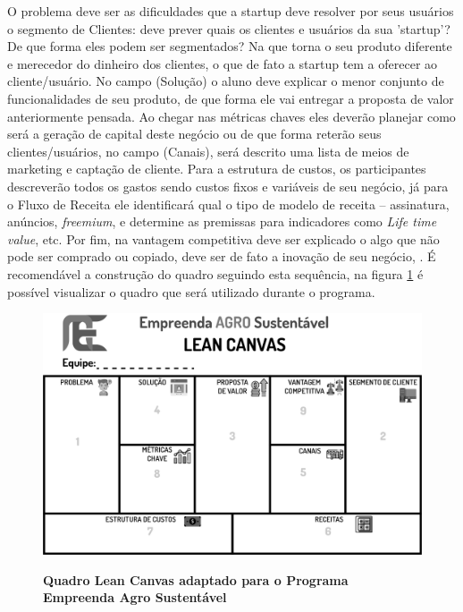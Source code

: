 O problema deve ser as dificuldades que a startup deve resolver por seus usuários o segmento de Clientes: deve prever quais os clientes e usuários da sua 'startup'? De que forma eles podem ser segmentados? Na que torna o seu produto diferente e merecedor do dinheiro dos clientes, o que de fato a startup tem a oferecer ao cliente/usuário. No campo (Solução) o aluno deve explicar o menor conjunto de funcionalidades de seu produto, de que forma ele vai entregar a proposta de valor anteriormente pensada. Ao chegar nas métricas chaves eles deverão planejar como será a geração de capital deste negócio ou de que forma reterão seus clientes/usuários, no campo (Canais), será descrito uma lista de meios de marketing e captação de cliente. Para a estrutura de custos, os participantes descreverão todos os gastos sendo custos fixos e variáveis de seu negócio, já para o Fluxo de Receita ele identificará qual o tipo de modelo de receita – assinatura, anúncios, \textit{freemium}, e determine as premissas para indicadores como \textit{Life time value}, etc. Por fim, na vantagem competitiva deve ser explicado o algo que não pode ser comprado ou copiado, deve ser de fato a inovação de seu negócio, \cite{maurya_running_2012, sebrae_aprenda_2019}. É recomendável a construção do quadro seguindo esta sequência, na figura \ref{figura_7} é possível visualizar o quadro que será utilizado durante o programa. 



\begin{figure}[h!]
\centering
\caption{\textbf{Quadro Lean Canvas adaptado para o Programa Empreenda Agro Sustentável}}
\includegraphics[scale=0.2]{Imagens/canvas.png}
\label{figura_7}
\end{figure}
\newpage

